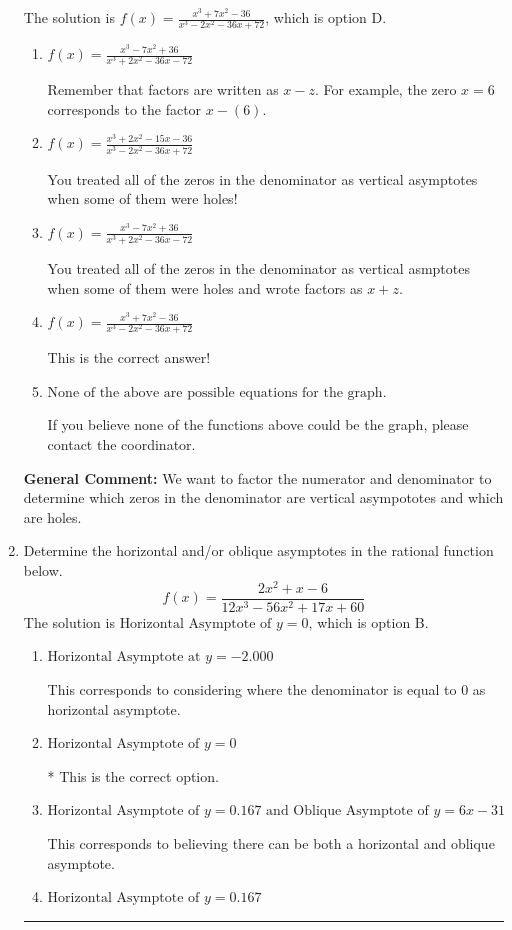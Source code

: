 \documentclass{extbook}[14pt]
\newcommand{\litem}[1]{\item #1

\rule{\textwidth}{0.4pt}}
\begin{document}
\begin{enumerate}
{The solution is \( f(x)=\frac{x^{3} +7 x^{2} -36}{x^{3} -2 x^{2} -36 x + 72} \), which is option D.\begin{enumerate}[label=\Alph*.]
\item \( f(x)=\frac{x^{3} -7 x^{2} + 36}{x^{3} +2 x^{2} -36 x -72} \)

Remember that factors are written as $x-z$. For example, the zero $x=6$ corresponds to the factor $x-(6)$.
\item \( f(x)=\frac{x^{3} +2 x^{2} -15 x -36}{x^{3} -2 x^{2} -36 x + 72} \)

You treated all of the zeros in the denominator as vertical asymptotes when some of them were holes!
\item \( f(x)=\frac{x^{3} -7 x^{2} + 36}{x^{3} +2 x^{2} -36 x -72} \)

You treated all of the zeros in the denominator as vertical asmptotes when some of them were holes and wrote factors as $x+z$.
\item \( f(x)=\frac{x^{3} +7 x^{2} -36}{x^{3} -2 x^{2} -36 x + 72} \)

This is the correct answer!
\item \( \text{None of the above are possible equations for the graph.} \)

If you believe none of the functions above could be the graph, please contact the coordinator.
\end{enumerate}

\textbf{General Comment:} We want to factor the numerator and denominator to determine which zeros in the denominator are vertical asympototes and which are holes.
}
\litem{
Determine the horizontal and/or oblique asymptotes in the rational function below.
\[ f(x) = \frac{2x^{2} +x -6}{12x^{3} -56 x^{2} +17 x + 60} \]The solution is \( \text{Horizontal Asymptote of } y = 0 \), which is option B.\begin{enumerate}[label=\Alph*.]
\item \( \text{Horizontal Asymptote at } y = -2.000 \)

This corresponds to considering where the denominator is equal to 0 as horizontal asymptote.
\item \( \text{Horizontal Asymptote of } y = 0 \)

* This is the correct option.
\item \( \text{Horizontal Asymptote of } y = 0.167 \text{ and Oblique Asymptote of } y = 6x -31 \)

This corresponds to believing there can be both a horizontal and oblique asymptote.
\item \( \text{Horizontal Asymptote of } y = 0.167  \)


\end{enumerate}}
\end{enumerate}
\end{document}
